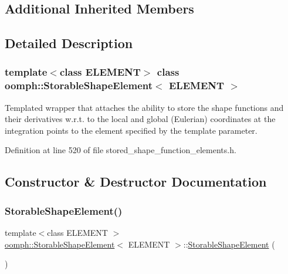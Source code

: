 \subsection*{Additional Inherited Members}


\subsection{Detailed Description}
\subsubsection*{template$<$class E\+L\+E\+M\+E\+NT$>$\newline
class oomph\+::\+Storable\+Shape\+Element$<$ E\+L\+E\+M\+E\+N\+T $>$}

Templated wrapper that attaches the ability to store the shape functions and their derivatives w.\+r.\+t. to the local and global (Eulerian) coordinates at the integration points to the element specified by the template parameter. 

Definition at line 520 of file stored\+\_\+shape\+\_\+function\+\_\+elements.\+h.



\subsection{Constructor \& Destructor Documentation}
\mbox{\label{classoomph_1_1StorableShapeElement_a80c9e4c6b6b908eeec3fa1f2460ed412}} 
\subsubsection{\texorpdfstring{Storable\+Shape\+Element()}{StorableShapeElement()}\hspace{0.1cm}{\footnotesize\ttfamily [1/2]}}
{\footnotesize\ttfamily template$<$class E\+L\+E\+M\+E\+NT $>$ \\
\hyperlink{classoomph_1_1StorableShapeElement}{oomph\+::\+Storable\+Shape\+Element}$<$ E\+L\+E\+M\+E\+NT $>$\+::\hyperlink{classoomph_1_1StorableShapeElement}{Storable\+Shape\+Element} (\begin{DoxyParamCaption}{ }\end{DoxyParamCaption})\hspace{0.3cm}{\ttfamily [inline]}}



